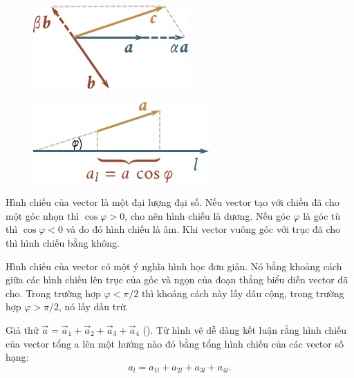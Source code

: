 \begin{figure}[!htb]
	\begin{minipage}[htb!]{0.5\linewidth}
		\begin{center}
			\includegraphics[scale=1]{figures/ch_01/fig_1_9.pdf}
			\caption[]{}
			\label{fig:1_9}
		\end{center}
	\end{minipage}
	\hfill{ }%
	\begin{minipage}[htb!]{0.5\linewidth}
		\begin{center}
			\includegraphics[scale=0.95]{figures/ch_01/fig_1_10.pdf}
			\caption[]{}
			\label{fig:1_10}
		\end{center}
	\end{minipage}
\end{figure}

Hình chiếu của vector là một đại lượng đại số. Nếu vector tạo với chiều đã cho một góc nhọn thì $\cos\varphi>0$, cho nên hình chiếu là dương. Nếu góc $\varphi$ là góc tù thì $\cos\varphi<0$ và do đó hình chiếu là âm. Khi vector vuông góc với trục đã cho thì hình chiếu bằng không. 

Hình chiếu của vector có một ý nghĩa hình học đơn giản. Nó bằng khoảng cách giữa các hình chiếu lên trục của gốc và ngọn của đoạn thẳng biểu diễn vector đã cho. Trong trường hợp $\varphi<\pi/2$ thì khoảng cách này lấy dâu cộng, trong trường hợp $\varphi>\pi/2$, nó lấy dấu trừ.

Giả thử $\vec{a} = \vec{a}_1+\vec{a}_2+\vec{a}_3+\vec{a}_4$ (). Từ hình vẽ dễ dàng kết luận rằng hình chiếu của vector tổng a lên một hướng nào đó bằng tổng hình chiếu của các vector số hạng:
\begin{equation}\label{eq:1_8}
a_l = a_{1l}+a_{2l}+a_{3l}+a_{4l}.
\end{equation}

